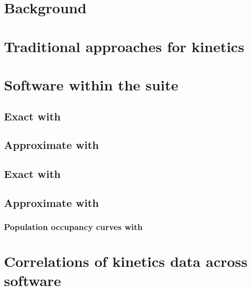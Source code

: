 \section{Background}
\label{sec:hermes:bkgrnd}

\section{Traditional approaches for kinetics}
\label{sec:hermes:kinetics}

\subsection{\Mfpt}
\label{subsec:hermes:mfpt}

\subsection{\Eqt}
\label{subsec:hermes:eq}

\section{Software within the \hermes suite}
\label{sec:hermes:layout}

\subsection{Exact \mfpt with \rnamfpt}
\label{subsec:hermes:rnamfpt}

\subsection{Approximate \mfpt with \fftmfpt}
\label{subsec:hermes:fftmfpt}

\subsection{Exact \eqt with \rnaeq}
\label{subsec:hermes:rnaeq}

\subsection{Approximate \eqt with \ffteq}
\label{subsec:hermes:ffteq}

\subsubsection{Population occupancy curves with \ffteq}
\label{subsubsec:hermes:popcurve}

\section{Correlations of kinetics data across software}
\label{sec:hermes:corr}
